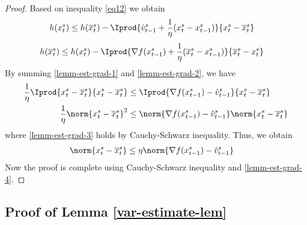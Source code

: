 \begin{proof}
Based on inequality \eqref{eq12} we obtain
\begin{align}
h(x_t^s)&\leq h(\overline{x}_t^s) - \Iprod{\hat{v}_{t-1}^s+\frac{1}{\eta}(x_t^s-x_{t-1}^s)}{x_t^s-\overline{x}_t^s}\label{lemm-est-grad-1}
\end{align}
\begin{align}
h(\overline{x}_t^s)&\leq h({x}_t^s) - \Iprod{\nabla f(x_{t-1}^s)+\frac{1}{\eta}(\overline{x}_t^s-x_{t-1}^s)}{\overline{x}_t^s-x_t^s}\label{lemm-est-grad-2}
\end{align}
By summing \eqref{lemm-est-grad-1} and \eqref{lemm-est-grad-2}, we have 
\begin{align}
\frac{1}{\eta}\Iprod{x_t^s -\overline{x}_t^s}{x_t^s -\overline{x}_t^s} &\leq \Iprod{\nabla f(x_{t-1}^s) -\hat{v}_{t-1}^s}{x_t^s -\overline{x}_t^s}\notag\\
\frac{1}{\eta}\norm{x_t^s -\overline{x}_t^s}^2 &\leq \norm{\nabla f(x_{t-1}^s) -\hat{v}_{t-1}^s}\norm{x_t^s -\overline{x}_t^s}\label{lemm-est-grad-3}
\end{align}
where \eqref{lemm-est-grad-3} holds by Cauchy-Schwarz inequality. 
Thus, we obtain
\begin{align}
\norm{x_t^s -\overline{x}_t^s} &\leq \eta\norm{\nabla f(x_{t-1}^s) -\hat{v}_{t-1}^s}\label{lemm-est-grad-4}
\end{align}
Now the proof is complete using Cauchy-Schwarz inequality and \eqref{lemm-est-grad-4}.
\end{proof}
\noindent\subsection{Proof of Lemma \ref{var-estimate-lem}}
